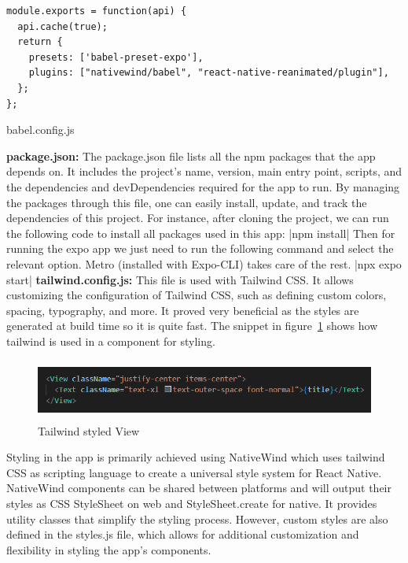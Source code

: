 \begin{listing}[H]
\begin{verbatim} 
module.exports = function(api) {
  api.cache(true);
  return {
    presets: ['babel-preset-expo'],
    plugins: ["nativewind/babel", "react-native-reanimated/plugin"],
  };
};
\end{verbatim}
\caption{babel.config.js}
\label{src:babel}
\end{listing}
    \textbf{package.json:} The package.json file lists all the npm packages that the app depends on. It includes the project's name, version, main entry point, scripts, and the dependencies and devDependencies required for the app to run. By managing the packages through this file, one can easily install, update, and track the dependencies of this project. For instance, after cloning the project, we can run the following code to install all packages used in this app:
            |npm install|
    Then for running the expo app we just need to run the following command and select the relevant option. Metro (installed with Expo-CLI) takes care of the rest.
            |npx expo start|
    \textbf{tailwind.config.js:} This file is used with Tailwind CSS. It allows customizing the configuration of Tailwind CSS, such as defining custom colors, spacing, typography, and more. It proved very beneficial as the styles are generated at build time so it is quite fast. The snippet in figure~\ref{fig:twrn} shows how tailwind is used in a component for styling.
\begin{figure}[H]
	\centering
	\includegraphics[width=1\textwidth,width=12cm, height=2cm]{images/twrn_styled.png}
	\caption{Tailwind styled View}
	\label{fig:twrn}
\end{figure}
    Styling in the app is primarily achieved using NativeWind which uses tailwind CSS as scripting language to create a universal style system for React Native. NativeWind components can be shared between platforms and will output their styles as CSS StyleSheet on web and StyleSheet.create for native. It provides utility classes that simplify the styling process. However, custom styles are also defined in the styles.js file, which allows for additional customization and flexibility in styling the app's components. \cite{nativewinddocs}

